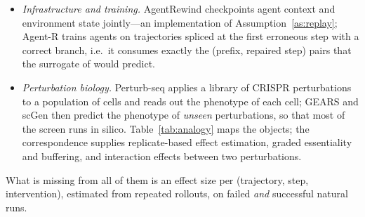 \begin{itemize}[leftmargin=1.1em]
\item \emph{Infrastructure and training.} AgentRewind \cite{zhuang2026agentrewind} checkpoints agent context and environment state jointly---an implementation of Assumption~\ref{as:replay}; Agent-R \cite{yuan2025agentr} trains agents on trajectories spliced at the first erroneous step with a correct branch, i.e.\ it consumes exactly the (prefix, repaired step) pairs that the surrogate of  would predict.
\item \emph{Perturbation biology.} Perturb-seq \cite{dixit2016perturbseq} applies a library of CRISPR perturbations to a population of cells and reads out the phenotype of each cell; GEARS \cite{roohani2024gears} and scGen \cite{lotfollahi2019scgen} then predict the phenotype of \emph{unseen} perturbations, so that most of the screen runs in silico. Table~\ref{tab:analogy} maps the objects; the correspondence supplies replicate-based effect estimation, graded essentiality and buffering, and interaction effects between two perturbations.
\end{itemize}
What is missing from all of them is an effect size per (trajectory, step, intervention), estimated from repeated rollouts, on failed \emph{and} successful natural runs.

